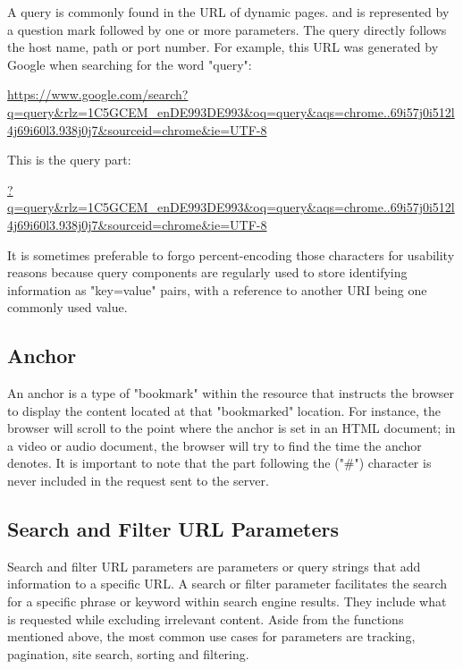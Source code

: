 A query is commonly found in the URL of dynamic pages. and is represented by a question mark followed by one or more parameters. The query directly follows the host name, path or port number. For example, this URL was generated by Google when searching for the word "query":

\begin{center}
  \url{https://www.google.com/search?q=query&rlz=1C5GCEM_enDE993DE993&oq=query&aqs=chrome..69i57j0i512l4j69i60l3.938j0j7&sourceid=chrome&ie=UTF-8}
\end{center}

\noindent This is the query part:

\begin{center}
  \url{?q=query&rlz=1C5GCEM_enDE993DE993&oq=query&aqs=chrome..69i57j0i512l4j69i60l3.938j0j7&sourceid=chrome&ie=UTF-8}
\end{center}

It is sometimes preferable to forgo percent-encoding those characters for usability reasons because query components are regularly used to store identifying information as "key=value" pairs, with a reference to another URI being one commonly used value.

\subsection*{Anchor}
An anchor is a type of "bookmark" within the resource that instructs the browser to display the content located at that "bookmarked" location. For instance, the browser will scroll to the point where the anchor is set in an HTML document; in a video or audio document, the browser will try to find the time the anchor denotes. It is important to note that the part following the ("\#") character is never included in the request sent to the server.

\subsection{Search and Filter URL Parameters}
Search and filter URL parameters are parameters or query strings that add information to a specific URL. A search or filter parameter facilitates the search for a specific phrase or keyword within search engine results. They include what is requested while excluding irrelevant content. Aside from the functions mentioned above, the most common use cases for parameters are tracking, pagination, site search, sorting and filtering.


